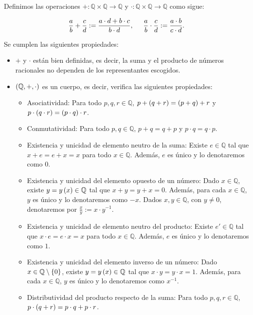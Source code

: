 \begin{proposition}
\rm Definimos las operaciones $+:\mathbb{Q}\times\mathbb{Q}\rightarrow\mathbb{Q}$ y $\cdot:\mathbb{Q}\times\mathbb{Q}\rightarrow\mathbb{Q}$ como sigue:

\begin{equation}
    \frac{a}{b}+\frac{c}{d}:=\frac{a\cdot d+b\cdot c}{b\cdot d},\hspace{0.5cm}\frac{a}{b}\cdot\frac{c}{d}:=\frac{a\cdot b}{c\cdot d}.
\end{equation}

Se cumplen las siguientes propiedades:

\begin{itemize}
    \item[1.] $+$ y $\cdot$ están bien definidas, es decir, la suma y el producto de números racionales no dependen de los representantes escogidos.
    \item[2.] $\left(\mathbb{Q},+,\cdot\right)$ es un cuerpo, es decir, verifica las siguientes propiedades:
    \begin{itemize}
      \item Asociatividad: Para todo $p,q,r\in\mathbb{Q}$, $p+\left(q+r\right)=\left(p+q\right)+r$ y $p\cdot\left(q\cdot r\right)=\left(p\cdot q\right)\cdot r$.
      \item Conmutatividad: Para todo $p,q\in\mathbb{Q}$, $p+q=q+p$ y $p\cdot q=q\cdot p$.
      \item Existencia y unicidad de elemento neutro de la suma: Existe $e\in\mathbb{Q}$ tal que $x+e=e+x=x$ para todo $x\in\mathbb{Q}$. Además, $e$ es único y lo denotaremos como $0$.
      \item Existencia y unicidad del elemento opuesto de un número: Dado $x\in\mathbb{Q}$, existe $y=y\left(x\right)\in\mathbb{Q}$ tal que $x+y=y+x=0$. Además, para cada $x\in\mathbb{Q}$, $y$ es único y lo denotaremos como $-x$. Dados $x,y\in\mathbb{Q}$, con $y\neq 0$, denotaremos por $\displaystyle\frac{x}{y}:=x\cdot y^{-1}$.
      \item Existencia y unicidad de elemento neutro del producto: Existe $e'\in\mathbb{Q}$ tal que $x\cdot e=e\cdot x=x$ para todo $x\in\mathbb{Q}$. Además, $e$ es único y lo denotaremos como $1$.
      \item Existencia y unicidad del elemento inverso de un número: Dado $x\in\mathbb{Q}\setminus\left\{0\right\}$, existe $y=y\left(x\right)\in\mathbb{Q}$ tal que $x\cdot y=y\cdot x=1$. Además, para cada $x\in\mathbb{Q}$, $y$ es único y lo denotaremos como $x^{-1}$. 
      \item Distributividad del producto respecto de la suma: Para todo $p,q,r\in\mathbb{Q}$, $p\cdot \left(q+r\right)=p\cdot q+p\cdot r$.

\end{itemize}
\end{itemize}
\end{proposition}
